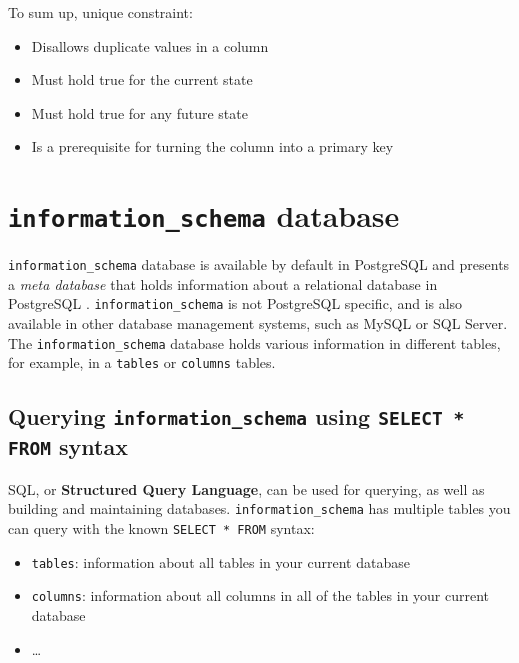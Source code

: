 \documentclass[11pt]{article}
\begin{document}
    To sum up, unique constraint:

    \begin{itemize}
        \item Disallows duplicate values in a column
        \item Must hold true for the current state
        \item Must hold true for any future state
        \item Is a prerequisite for turning the column into a primary key
    \end{itemize}

    \section{\texttt{information\_schema} database} \label{sec:info_schema}

    \texttt{information\_schema} database is available by default in PostgreSQL and presents a \textit{meta database} that holds information about a relational database in PostgreSQL .
    \texttt{information\_schema} is not PostgreSQL specific, and is also available in other database management systems, such as MySQL or SQL Server.
    The \texttt{information\_schema} database holds various information in different tables, for example, in a \texttt{tables} or \texttt{columns} tables.

    \subsection{Querying \texttt{information\_schema} using \texttt{SELECT * FROM} syntax} \label{subsec:info_schema_q}

    SQL, or \textbf{Structured Query Language}, can be used for querying, as well as building and maintaining databases.
    \texttt{information\_schema} has multiple tables you can query with the known \texttt{SELECT * FROM} syntax:

    \begin{itemize}
        \item \texttt{tables}: information about all tables in your current database
        \item \texttt{columns}: information about all columns in all of the tables in your current database
        \item \ldots
    \end{itemize}

    \vspace{5mm}
\end{document}

